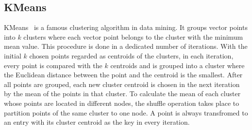\documentclass[10pt,journal,compsoc]{IEEEtran}
\newcommand{\red}[1]{\textcolor{red}{#1}}
\begin{document}

\subsection{KMeans}\label{section:kmeans}
KMeans~\cite{kmeans} is a famous clustering algorithm in data mining.
It groups vector points into $k$ clusters where each vector point belongs to the cluster with the minimum mean value. 
This procedure is done in a dedicated number of iterations. 
With the initial $k$ chosen points regarded as centroids of the clusters, 
in each iteration, every point is compared with the $k$ centroids and is grouped into a cluster where the Euclidean distance between the point and the centroid is the smallest. 
After all points are grouped, each new cluster centroid is chosen in the next iteration by the mean of the points in that cluster. 
To calculate the mean of each cluster whose points are located in different nodes, the shuffle operation takes place to partition points of the same cluster to one node. 
A point is always transfromed to an entry with its cluster centroid as the key in every iteration. 

\end{document}
